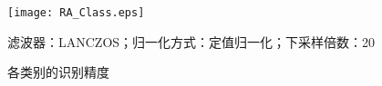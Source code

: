 \begin{figure}[h]
    \centering
    \texttt{[image: RA\_Class.eps]}
    \caption{各类别的识别精度}{滤波器：LANCZOS；归一化方式：定值归一化；下采样倍数：20}\label{fig-result_class_accuracy}
\end{figure}